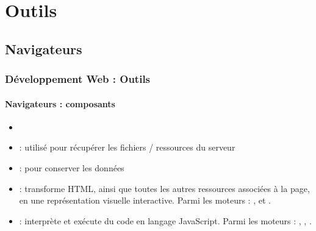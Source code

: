 \documentclass[xcolor=table]{beamer}
\begin{document}
\section{Outils}

\subsection{Navigateurs}

\begin{frame}
\frametitle{Développement Web : Outils}
\framesubtitle{Navigateurs : composants}

\begin{itemize}
	\item {}
	\item {} : utilisé pour récupérer les fichiers / ressources du serveur
	\item {} : pour conserver les données
	\item {} : transforme HTML, ainsi que toutes les autres ressources associées à la page, en une représentation visuelle interactive. 
	Parmi les moteurs : ,  et .
	\item {} : interprète et exécute du code en langage JavaScript.
	Parmi les moteurs : ,  , .
\end{itemize}

\end{frame}
\end{document}
